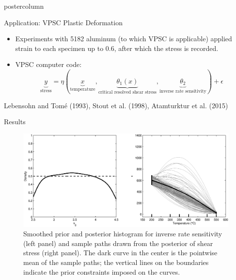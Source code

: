 \documentclass[final,10pt]{beamer}  %
\begin{document}
\begin{frame}{}
\begin{columns}[t]
\begin{column}{.33\textwidth}
\begin{beamercolorbox}[center,wd=1.625\textwidth]{postercolumn}
\begin{minipage}[T]{\textwidth}
{\begin{block}{Application: VPSC Plastic Deformation}
{\begin{itemize}
                \item
                Experiments with 5182 aluminum (to which VPSC is applicable) applied strain to each specimen up to 0.6, after which the stress is recorded.

                \item
                VPSC computer code:
                \[
                    \underbrace{y}_{\text{stress}} = \eta(\underbrace{x}_{\text{temperature}}, \underbrace{\theta_1(x)}_{\text{critical resolved shear stress}}, \underbrace{\theta_2}_{\text{inverse rate sensitivity}}) + \epsilon
                \]
            \end{itemize}

                \hfill {\tiny Lebensohn and Tom\'{e} (1993), Stout et al. (1998), Atamturktur et al. (2015)}

            }
        \end{block}
        \vfill


        \begin{block}{Results}
        {\small
        \begin{figure}[tb]
            \centering
            \includegraphics[scale= 0.55, clip= TRUE, trim= 0in 0pt 0in 0in]{VPSC_G_PostPlots_CleanedUp.eps}  %
            \caption{Smoothed prior and posterior histogram for inverse rate sensitivity (left panel) and sample paths drawn from the posterior of shear stress (right panel). The dark curve in the center is the pointwise mean of the sample paths; the vertical lines on the boundaries indicate the prior constraints imposed on the curves.}
        \end{figure}

}
\end{block}}
\end{minipage}
\end{beamercolorbox}
\end{column}
\end{columns}
\end{frame}
\end{document}
